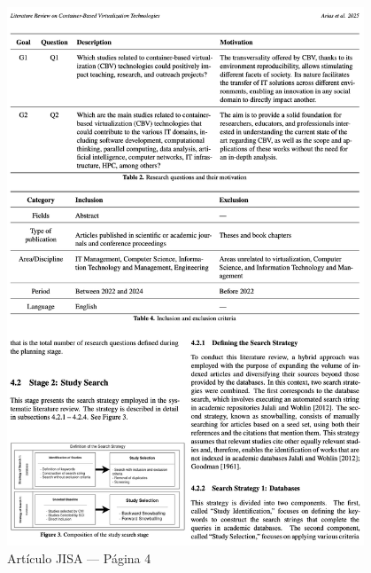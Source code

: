 \begin{figure}[H]
    \centering
    \begin{tcolorbox}[
        colback=white,
        colframe=gray!50,
        boxrule=1pt,
        arc=2pt,
        boxsep=5pt,
        left=3pt,
        right=3pt,
        top=3pt,
        bottom=3pt,
        drop shadow
    ]
        \includegraphics[width=0.95\textwidth,keepaspectratio]{apendices/JISA/pagina_4.png}
    \end{tcolorbox}
    \caption{Artículo JISA --- Página 4}\label{fig:jisa-pagina-4}
\end{figure}
\FloatBarrier%
